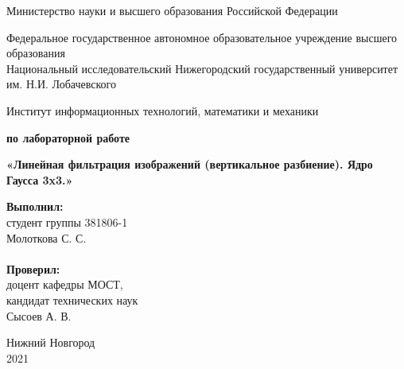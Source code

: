 \documentclass{report}
\begin{document}
\begin{titlepage}

\begin{center}
Министерство науки и высшего образования Российской Федерации
\end{center}

\begin{center}
Федеральное государственное автономное образовательное учреждение высшего образования \\
Национальный исследовательский Нижегородский государственный университет им. Н.И. Лобачевского
\end{center}

\begin{center}
Институт информационных технологий, математики и механики
\end{center}

\vspace{4em}

\begin{center}
\textbf{ по лабораторной работе} \\
\end{center}
\begin{center}
\textbf{\Large«Линейная фильтрация изображений (вертикальное разбиение). Ядро Гаусса 3x3.»} \\
\end{center}

\vspace{4em}

\newbox{\lbox}
\newlength{\maxl}
\setlength{\maxl}{\wd\lbox}
\hfill\parbox{7cm}{
\hspace*{5cm}\hspace*{-5cm}\textbf{Выполнил:} \\ студент группы 381806-1 \\ Молоткова С. С.\\
\\
\hspace*{5cm}\hspace*{-5cm}\textbf{Проверил:}\\ доцент кафедры МОСТ, \\ кандидат технических наук \\ Сысоев А. В.\\
}
\vspace{\fill}

\begin{center} Нижний Новгород \\ 2021 \end{center}

\end{titlepage}
\end{document}
